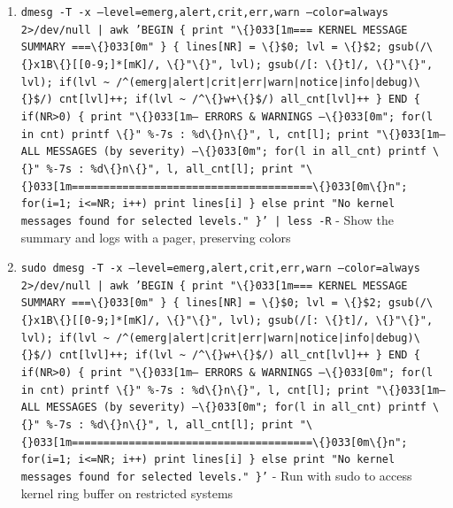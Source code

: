 \documentclass[openany]{book}
\begin{document}
\begin{enumerate}
  \item \texttt{dmesg -T -x --level=emerg,alert,crit,err,warn --color=always 2>/dev/null | awk 'BEGIN \{ print "\textbackslash\{\}033[1m=== KERNEL MESSAGE SUMMARY ===\textbackslash\{\}033[0m" \} \{ lines[NR] = \textbackslash\{\}\$0; lvl = \textbackslash\{\}\$2; gsub(/\textbackslash\{\}x1B\textbackslash\{\}[[0-9;]*[mK]/, \textbackslash\{\}"\textbackslash\{\}", lvl); gsub(/[: \textbackslash\{\}t]/, \textbackslash\{\}"\textbackslash\{\}", lvl); if(lvl \textasciitilde{} /\textasciicircum{}(emerg|alert|crit|err|warn|notice|info|debug)\textbackslash\{\}\$/) cnt[lvl]++; if(lvl \textasciitilde{} /\textasciicircum{}\textbackslash\{\}w+\textbackslash\{\}\$/) all\_cnt[lvl]++ \} END \{ if(NR>0) \{ print "\textbackslash\{\}033[1m--- ERRORS \& WARNINGS ---\textbackslash\{\}033[0m"; for(l in cnt) printf \textbackslash\{\}"  \%-7s : \%d\textbackslash\{\}n\textbackslash\{\}", l, cnt[l]; print "\textbackslash\{\}033[1m--- ALL MESSAGES (by severity) ---\textbackslash\{\}033[0m"; for(l in all\_cnt) printf \textbackslash\{\}"  \%-7s : \%d\textbackslash\{\}n\textbackslash\{\}", l, all\_cnt[l]; print "\textbackslash\{\}033[1m======================================\textbackslash\{\}033[0m\textbackslash\{\}n"; for(i=1; i<=NR; i++) print lines[i] \} else print "No kernel messages found for selected levels." \}' | less -R} - Show the summary and logs with a pager, preserving colors
  \item \texttt{sudo dmesg -T -x --level=emerg,alert,crit,err,warn --color=always 2>/dev/null | awk 'BEGIN \{ print "\textbackslash\{\}033[1m=== KERNEL MESSAGE SUMMARY ===\textbackslash\{\}033[0m" \} \{ lines[NR] = \textbackslash\{\}\$0; lvl = \textbackslash\{\}\$2; gsub(/\textbackslash\{\}x1B\textbackslash\{\}[[0-9;]*[mK]/, \textbackslash\{\}"\textbackslash\{\}", lvl); gsub(/[: \textbackslash\{\}t]/, \textbackslash\{\}"\textbackslash\{\}", lvl); if(lvl \textasciitilde{} /\textasciicircum{}(emerg|alert|crit|err|warn|notice|info|debug)\textbackslash\{\}\$/) cnt[lvl]++; if(lvl \textasciitilde{} /\textasciicircum{}\textbackslash\{\}w+\textbackslash\{\}\$/) all\_cnt[lvl]++ \} END \{ if(NR>0) \{ print "\textbackslash\{\}033[1m--- ERRORS \& WARNINGS ---\textbackslash\{\}033[0m"; for(l in cnt) printf \textbackslash\{\}"  \%-7s : \%d\textbackslash\{\}n\textbackslash\{\}", l, cnt[l]; print "\textbackslash\{\}033[1m--- ALL MESSAGES (by severity) ---\textbackslash\{\}033[0m"; for(l in all\_cnt) printf \textbackslash\{\}"  \%-7s : \%d\textbackslash\{\}n\textbackslash\{\}", l, all\_cnt[l]; print "\textbackslash\{\}033[1m======================================\textbackslash\{\}033[0m\textbackslash\{\}n"; for(i=1; i<=NR; i++) print lines[i] \} else print "No kernel messages found for selected levels." \}'} - Run with sudo to access kernel ring buffer on restricted systems
\end{enumerate}
\end{document}
